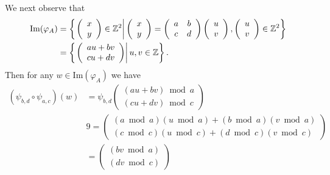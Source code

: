 \documentclass{article}
\begin{document}
\begin{Answer}
\begin{enumerate}
{    We next observe that
    \begin{align*}
    \mathrm{Im}(\varphi_A) &=
      \left\{
        \left.
        \left(\begin{array}{c}
          x \\ y
        \end{array}\right)
        \in \mathbb{Z}^2
        \right|
        \left(\begin{array}{c}
          x \\ y
        \end{array}\right) =
        \left(\begin{array}{c c}
          a & b \\ c & d
        \end{array}\right)
        \left(\begin{array}{c}
          u \\ v
        \end{array}\right),
        \left(\begin{array}{c}
          u \\ v
        \end{array}\right) \in \mathbb{Z}^2
      \right\} \\
      &=
      \left\{
        \left.
          \left(\begin{array}{c}
            au + bv \\ cu + dv
          \end{array}\right)
        \right|
        u, v \in \mathbb{Z}
      \right\}.
    \end{align*}
    Then for any $w \in \mathrm{Im}(\varphi_A)$ we have
    \begin{align*}
    (\psi_{b,d} \circ \psi_{a,c})(w) &=
    \psi_{b,d}\left(\begin{array}{c}
            (au + bv) \bmod a \\
            (cu + dv) \bmod c
          \end{array}\right) \\
          &9=
          \left(\begin{array}{c}
            (a \bmod a)(u \bmod a) + (b \bmod a)(v \bmod a) \\
            (c \bmod c)(u \bmod c) + (d \bmod c)(v \bmod c)
          \end{array}\right) \\
          &=
          \left(\begin{array}{c}
            (bv \bmod a) \\
            (dv \bmod c)
          \end{array}\right)
    \end{align*}
  }
\end{enumerate}
\end{Answer}
\end{document}
